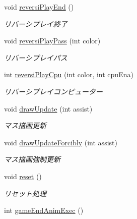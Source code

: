 \begin{DoxyCompactItemize}
void \hyperlink{classjp_1_1gr_1_1java__conf_1_1yuta__yoshinaga_1_1reversi_1_1model_1_1_reversi_play_abd208c350d3713ef6872faaa813ac8c3}{reversi\+Play\+End} ()
\begin{DoxyCompactList}\small\item\em リバーシプレイ終了 \end{DoxyCompactList}\item 
void \hyperlink{classjp_1_1gr_1_1java__conf_1_1yuta__yoshinaga_1_1reversi_1_1model_1_1_reversi_play_acf3c99fcbff26d65f7b12f99d69ab88d}{reversi\+Play\+Pass} (int color)
\begin{DoxyCompactList}\small\item\em リバーシプレイパス \end{DoxyCompactList}\item 
int \hyperlink{classjp_1_1gr_1_1java__conf_1_1yuta__yoshinaga_1_1reversi_1_1model_1_1_reversi_play_a1b1b5c91163c374bc2e0bf23ff922617}{reversi\+Play\+Cpu} (int color, int cpu\+Ena)
\begin{DoxyCompactList}\small\item\em リバーシプレイコンピューター \end{DoxyCompactList}\item 
void \hyperlink{classjp_1_1gr_1_1java__conf_1_1yuta__yoshinaga_1_1reversi_1_1model_1_1_reversi_play_a0522dfef43ea5a95aaa2086c22fcefe0}{draw\+Update} (int assist)
\begin{DoxyCompactList}\small\item\em マス描画更新 \end{DoxyCompactList}\item 
void \hyperlink{classjp_1_1gr_1_1java__conf_1_1yuta__yoshinaga_1_1reversi_1_1model_1_1_reversi_play_a216cece80255198785a95ccbaf1cef53}{draw\+Update\+Forcibly} (int assist)
\begin{DoxyCompactList}\small\item\em マス描画強制更新 \end{DoxyCompactList}\item 
void \hyperlink{classjp_1_1gr_1_1java__conf_1_1yuta__yoshinaga_1_1reversi_1_1model_1_1_reversi_play_a040fddf6e59c00de4c9c2ecdaedcb574}{reset} ()
\begin{DoxyCompactList}\small\item\em リセット処理 \end{DoxyCompactList}\item 
int \hyperlink{classjp_1_1gr_1_1java__conf_1_1yuta__yoshinaga_1_1reversi_1_1model_1_1_reversi_play_aaf0f07bdc219b6d8ec5551457fb551ab}{game\+End\+Anim\+Exec} ()

\end{DoxyCompactItemize}
